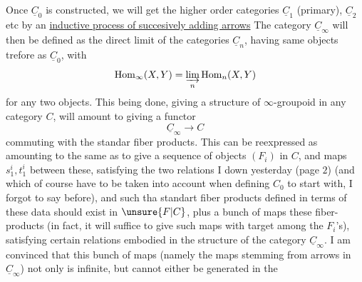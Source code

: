 Once $\underline{C}_0$ is constructed, we will get the higher order categories $\underline{C}_1$ (primary), $\underline{C}_2$ etc by an \uline{inductive process of succesively adding arrows} The category $\underline{C}_\infty$ will then be defined as the direct limit of the categories $\underline{C}_n$, having same objects trefore as $\underline{C}_0$, with
\[
\mathrm{Hom}_\infty(X,Y)=\varinjlim_n\mathrm{Hom}_n(X,Y)
\]
for any two objects. This being done, giving a structure of $\infty$-groupoid in any category $C$, will amount to giving a functor
\[
\underline{C}_\infty\longrightarrow C
\]
commuting with the standar  fiber products. This can be reexpressed\handwritten{,} as amounting to the same as to give a sequence of objects $(F_i)$ in $C$,  and maps $s^i_1,t^i_1$ between these, satisfying the two relations I  down yesterday (page $2$) (and which of course have to be taken into account when defining $C_0$ to start with, I forgot to say before), and such tha standart fiber products defined in terms of these data should exist in $\unsure{F|C}$,%
 plus a bunch of maps  these fiber-products  (in fact, it will suffice to give such maps with target among the $F_i$'s), satisfying certain relations embodied in the structure of the category $\underline{C}_\infty$. I am convinced that this bunch of maps (namely the maps stemming from arrows in $\underline{C}_\infty$) not only is infinite, but cannot either be generated in the

